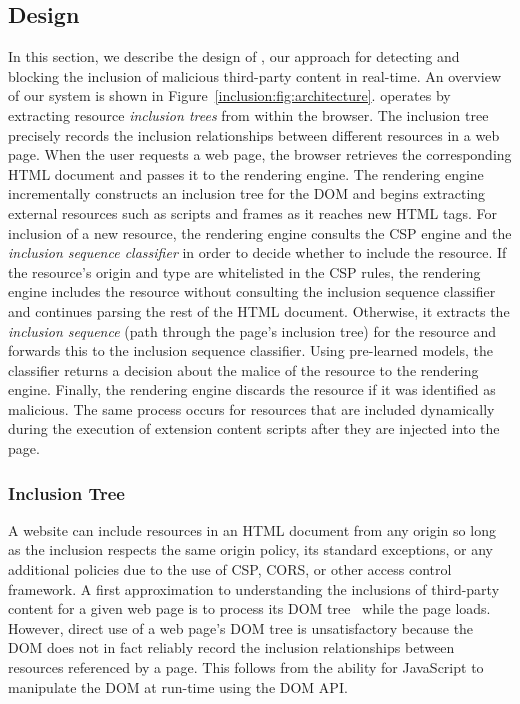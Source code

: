 \subsection{Design}
\label{inclusion:sec:design}



In this section, we describe the design of \excision, our approach for detecting
and blocking the inclusion of malicious third-party content in real-time. An
overview of our system is shown in Figure~\ref{inclusion:fig:architecture}.
\excision operates by extracting resource \emph{inclusion trees} from within the
browser. The inclusion tree precisely records the inclusion relationships
between different resources in a web page. When the user requests a web page,
the browser retrieves the corresponding HTML document and passes it to the
rendering engine. The rendering engine incrementally constructs an inclusion
tree for the DOM and begins extracting external resources such as scripts and
frames as it reaches new HTML tags. For inclusion of a new resource, the
rendering engine consults the CSP engine and the \emph{inclusion sequence
classifier} in order to decide whether to include the resource. If the
resource's origin and type are whitelisted in the CSP rules, the rendering
engine includes the resource without consulting the inclusion sequence
classifier and continues parsing the rest of the HTML document. Otherwise, it
extracts the \emph{inclusion sequence} (path through the page's inclusion tree)
for the resource and forwards this to the inclusion sequence classifier. Using
pre-learned models, the classifier returns a decision about the malice of the
resource to the rendering engine. Finally, the rendering engine discards the
resource if it was identified as malicious. The same process occurs for
resources that are included dynamically during the execution of extension
content scripts after they are injected into the page.

\subsubsection{Inclusion Tree}



A website can include resources in an HTML document from any origin so long as
the inclusion respects the same origin policy, its standard exceptions, or any
additional policies due to the use of CSP, CORS, or other access control
framework. A first approximation to understanding the inclusions of third-party
content for a given web page is to process its DOM tree~\cite{domtree} while the
page loads. However, direct use of a web page's DOM tree is unsatisfactory
because the DOM does not in fact reliably record the inclusion relationships
between resources referenced by a page. This follows from the ability for
JavaScript to manipulate the DOM at run-time using the DOM API.

